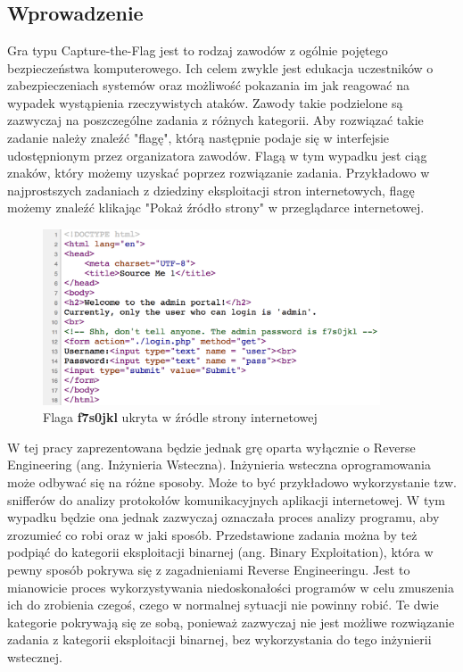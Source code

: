 \documentclass[polish,12pt]{aghthesis}
\author{Piotr Szczygieł}
\date{\the\year}
\begin{document}
\maketitle

\tableofcontents
\newpage

\section{\SectionTitleProjectVision}
\label{sec:cel-wizja}

\subsection{Wprowadzenie}

Gra typu Capture-the-Flag jest to rodzaj zawodów z ogólnie pojętego
bezpieczeństwa komputerowego. Ich celem zwykle jest edukacja uczestników
o zabezpieczeniach systemów oraz możliwość pokazania im jak reagować
na wypadek wystąpienia rzeczywistych ataków. Zawody takie podzielone są zazwyczaj
na poszczególne zadania z różnych kategorii. Aby rozwiązać takie zadanie należy
znaleźć "flagę", którą następnie podaje się w interfejsie udostępnionym przez
organizatora zawodów. Flagą w tym wypadku jest ciąg znaków, który możemy uzyskać
poprzez rozwiązanie zadania. Przykładowo w najprostszych zadaniach
z dziedziny eksploitacji stron internetowych, flagę możemy znaleźć klikając
"Pokaż źródło strony" w przeglądarce internetowej.

\begin{figure}[ht]
    \centering
    \includegraphics[width=10cm]{flag_page_source}
    \caption{Flaga \textbf{f7s0jkl} ukryta w źródle strony internetowej}
    \label{fig:flag_page_source}
\end{figure}

W tej pracy zaprezentowana będzie jednak grę oparta
wyłącznie o Reverse Engineering (ang. Inżynieria Wsteczna).
Inżynieria wsteczna oprogramowania może odbywać się na różne sposoby.
Może to być przykładowo wykorzystanie tzw. snifferów do analizy protokołów
komunikacyjnych aplikacji internetowej. W tym wypadku będzie ona jednak
zazwyczaj oznaczała proces analizy programu, aby zrozumieć co robi
oraz w jaki sposób. Przedstawione zadania można by też podpiąć do kategorii
eksploitacji binarnej (ang. Binary Exploitation), która w pewny sposób pokrywa
się z zagadnieniami Reverse Engineeringu. Jest to mianowicie proces
wykorzystywania niedoskonałości programów w celu zmuszenia ich do zrobienia
czegoś, czego w normalnej sytuacji nie powinny robić. Te dwie kategorie pokrywają
się ze sobą, ponieważ zazwyczaj nie jest możliwe rozwiązanie zadania z kategorii
eksploitacji binarnej, bez wykorzystania do tego inżynierii wstecznej. \pagebreak
\end{document}
